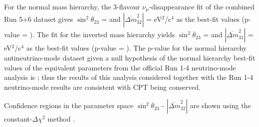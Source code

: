 For the normal mass hierarchy, the 3-flavour $\nu_{\mu}$-disappearance fit of the combined Run 5+6 dataset
gives $\sin^{2}\overline{\theta}_{23}$ = \BestFitMixingNormal{} and $|\overline{\Delta m}^{2}_{32}|$ = \BestFitDmsqNormal{}
eV$^{2}$/c$^{4}$ as the best-fit values (p-value = \PValueNormal). The fit for the inverted mass hierarchy yields
$\sin^{2}\overline{\theta}_{23}$ = \BestFitMixingInverted{} and $|\overline{\Delta m}^{2}_{31}|$ = \BestFitDmsqInverted{}
eV$^{2}$/c$^{4}$ as the best-fit values (p-value = \PValueInverted). The p-value for the normal hierarchy antineutrino-mode dataset 
given a null hypothesis of the normal hierarchy best-fit values of the equivalent parameters from the official Run 1-4 
neutrino-mode analysis is \PValueNuModeComp; thus the results of this analysis considered together with the Run 1-4 neutrino-mode results 
are consistent with CPT being conserved.

Confidence regions in the parameter space $\sin^{2}\overline{\theta}_{23}$ - $|\overline{\Delta m}^{2}_{32}|$ 
are shown using 
the constant-$\Delta\chi^2$ method
.
